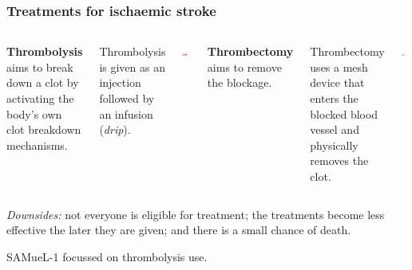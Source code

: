 \documentclass[xcolor={usenames,dvipsnames}]{beamer}
\begin{document}

\begin{frame}
\frametitle{Treatments for ischaemic stroke}

\begin{columns}
    \footnotesize{\textbf{Thrombolysis} aims to break down a clot by activating the body's own clot breakdown mechanisms.}
    
    \vspace{5mm}
    
    \footnotesize{Thrombolysis is given as an injection followed by an infusion (\emph{drip}).}
    
    \begin{center}
    \includegraphics[width=0.6\textwidth]{./images/thrombolysis_mechanism}
    \end{center}
    
    \footnotesize{\textbf{Thrombectomy} aims to remove the blockage.}
    
    \vspace{5mm}
    
    \footnotesize{Thrombectomy uses a mesh device that enters the blocked blood vessel and physically removes the clot.}
    
    \begin{center}
    \includegraphics[width=0.6\textwidth]{./images/thrombectomy_mesh}
    \end{center}

\end{columns}

\vspace{2em}
\footnotesize{\emph{Downsides:} not everyone is eligible for treatment; the treatments become less effective the later they are given; and there is a small chance of death.}

\vspace{1em}
\footnotesize{SAMueL-1 focussed on thrombolysis use.} 


\end{frame}
\end{document}
